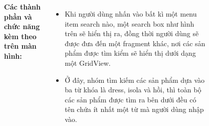 \documentclass{beamer}
\begin{document}
\begin{frame}
\begin{columns}
\begin{figure}
        \end{figure}
        \indent \textbf{Các thành phần và chức năng kèm theo trên màn hình:}
        \begin{itemize}
            \item Khi người dùng nhấn vào bất kì một menu item search nào, một search box như hình trên sẽ hiển thị ra, đồng thời người dùng sẽ được đưa đến một fragment khác, nơi các sản phẩm được tìm kiểm sẽ hiển thị dưới dạng một GridView.
            \item Ở đây, nhóm tìm kiếm các sản phẩm dựa vào ba từ khóa là \textsf{\color{teal} dress}, \textsf{\color{teal} isola} và \textsf{\color{teal} hồi}, thì toàn bộ các sản phẩm được tìm ra bên dưới đều có tên chứa ít nhất một từ mà người dùng nhập vào.
        \end{itemize}
    \end{columns}
\end{frame}
\end{document}
